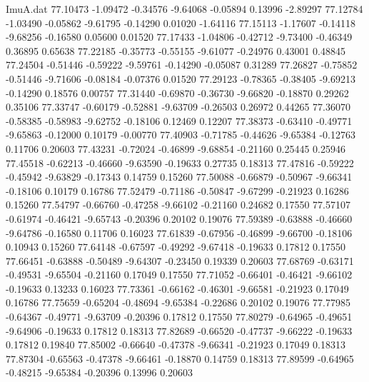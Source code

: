\begin{filecontents}{ImuA.dat}
  77.10473   -1.09472   -0.34576   -9.64068   -0.05894    0.13996   -2.89297
  77.12784   -1.03490   -0.05862   -9.61795   -0.14290    0.01020   -1.64116
  77.15113   -1.17607   -0.14118   -9.68256   -0.16580    0.05600    0.01520
  77.17433   -1.04806   -0.42712   -9.73400   -0.46349    0.36895    0.65638
  77.22185   -0.35773   -0.55155   -9.61077   -0.24976    0.43001    0.48845
  77.24504   -0.51446   -0.59222   -9.59761   -0.14290   -0.05087    0.31289
  77.26827   -0.75852   -0.51446   -9.71606   -0.08184   -0.07376    0.01520
  77.29123   -0.78365   -0.38405   -9.69213   -0.14290    0.18576    0.00757
  77.31440   -0.69870   -0.36730   -9.66820   -0.18870    0.29262    0.35106
  77.33747   -0.60179   -0.52881   -9.63709   -0.26503    0.26972    0.44265
  77.36070   -0.58385   -0.58983   -9.62752   -0.18106    0.12469    0.12207
  77.38373   -0.63410   -0.49771   -9.65863   -0.12000    0.10179   -0.00770
  77.40903   -0.71785   -0.44626   -9.65384   -0.12763    0.11706    0.20603
  77.43231   -0.72024   -0.46899   -9.68854   -0.21160    0.25445    0.25946
  77.45518   -0.62213   -0.46660   -9.63590   -0.19633    0.27735    0.18313
  77.47816   -0.59222   -0.45942   -9.63829   -0.17343    0.14759    0.15260
  77.50088   -0.66879   -0.50967   -9.66341   -0.18106    0.10179    0.16786
  77.52479   -0.71186   -0.50847   -9.67299   -0.21923    0.16286    0.15260
  77.54797   -0.66760   -0.47258   -9.66102   -0.21160    0.24682    0.17550
  77.57107   -0.61974   -0.46421   -9.65743   -0.20396    0.20102    0.19076
  77.59389   -0.63888   -0.46660   -9.64786   -0.16580    0.11706    0.16023
  77.61839   -0.67956   -0.46899   -9.66700   -0.18106    0.10943    0.15260
  77.64148   -0.67597   -0.49292   -9.67418   -0.19633    0.17812    0.17550
  77.66451   -0.63888   -0.50489   -9.64307   -0.23450    0.19339    0.20603
  77.68769   -0.63171   -0.49531   -9.65504   -0.21160    0.17049    0.17550
  77.71052   -0.66401   -0.46421   -9.66102   -0.19633    0.13233    0.16023
  77.73361   -0.66162   -0.46301   -9.66581   -0.21923    0.17049    0.16786
  77.75659   -0.65204   -0.48694   -9.65384   -0.22686    0.20102    0.19076
  77.77985   -0.64367   -0.49771   -9.63709   -0.20396    0.17812    0.17550
  77.80279   -0.64965   -0.49651   -9.64906   -0.19633    0.17812    0.18313
  77.82689   -0.66520   -0.47737   -9.66222   -0.19633    0.17812    0.19840
  77.85002   -0.66640   -0.47378   -9.66341   -0.21923    0.17049    0.18313
  77.87304   -0.65563   -0.47378   -9.66461   -0.18870    0.14759    0.18313
  77.89599   -0.64965   -0.48215   -9.65384   -0.20396    0.13996    0.20603

\end{filecontents}
